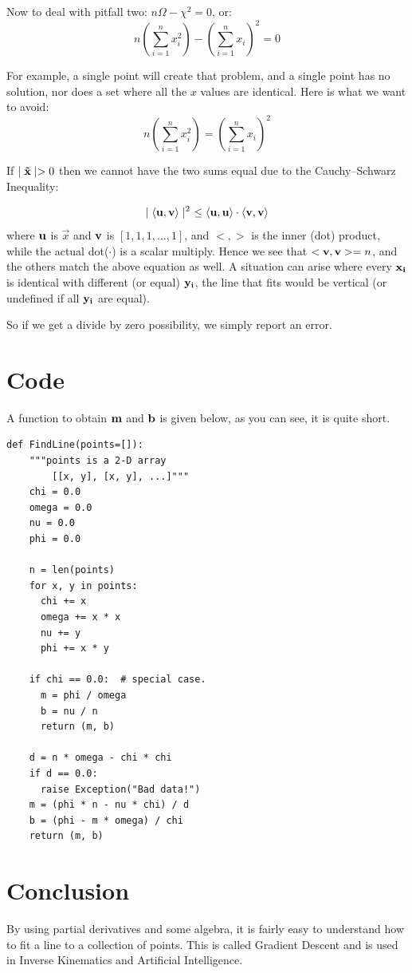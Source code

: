 \documentclass{article}
\begin{document}
Now to deal with pitfall two: $n \Omega - \chi^2 = 0$, or:
\begin{equation}
n  \left( \sum_{i=1}^n x_i^2 \right) - \left( \sum_{i=1}^n x_i \right)^2 = 0
\end{equation}

For example, a single point will create that problem, and a single point
has no solution, nor does a set where all the $x$ values are identical. Here is what we want to avoid:
\begin{equation}
n  \left( \sum_{i=1}^n x_i^2 \right) = \left( \sum_{i=1}^n x_i \right)^2
\end{equation}

If $\mid{\bf \vec{x} }\mid > 0$ then we cannot have the two sums equal due to
the  Cauchy–Schwarz Inequality:

\begin{equation}
\mid\left<{\bf u},{\bf v}\right>\mid^2 \
\le \left<{\bf u},{\bf u}\right>\cdot\left<{\bf v},{\bf v}\right>
\end{equation} 
where ${\bf u}$ is $\vec{x}$ and ${\bf v}$ is $[1, 1, 1, ..., 1]$, and
$< , >$ is the inner (dot) product, while the actual dot($\cdot$) is a
scalar multiply.   Hence we see that $<{\bf v}, {\bf v}> = n$, and the others
match the above equation as well.  A situation can arise where every ${\bf x_i}$
is identical with different (or equal) ${\bf y_i}$, the line that fits would
be vertical (or undefined if all ${\bf y_i}$ are equal). 

So if we get a divide by zero possibility, we simply report an error.

\vfill

\section{Code}
A function to obtain ${\bf m}$ and ${\bf b}$ is given below, as you can see,
it is quite short.
\lstset{language=Python}
\begin{lstlisting}[frame=single]
def FindLine(points=[]):
    """points is a 2-D array
        [[x, y], [x, y], ...]"""
    chi = 0.0
    omega = 0.0
    nu = 0.0
    phi = 0.0

    n = len(points)
    for x, y in points:
      chi += x
      omega += x * x
      nu += y
      phi += x * y

    if chi == 0.0:  # special case.
      m = phi / omega
      b = nu / n
      return (m, b)

    d = n * omega - chi * chi
    if d == 0.0:
      raise Exception("Bad data!")
    m = (phi * n - nu * chi) / d
    b = (phi - m * omega) / chi
    return (m, b)
\end{lstlisting}

\section{Conclusion}

By using partial derivatives and some algebra, it is fairly easy to
understand how to fit a line to a collection of points.  This is
called Gradient Descent and is used in Inverse Kinematics and
Artificial Intelligence.
\end{document}

